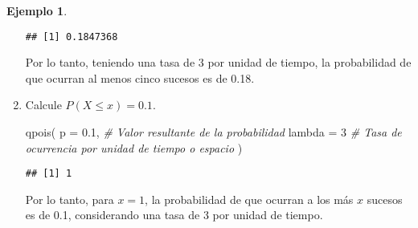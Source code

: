 \documentclass[
]{book}
\newenvironment{Shaded}{\begin{snugshade}}{\end{snugshade}}
\newcommand{\AttributeTok}[1]{\textcolor[rgb]{0.77,0.63,0.00}{#1}}
\newcommand{\CommentTok}[1]{\textcolor[rgb]{0.56,0.35,0.01}{\textit{#1}}}
\newcommand{\DecValTok}[1]{\textcolor[rgb]{0.00,0.00,0.81}{#1}}
\newcommand{\FloatTok}[1]{\textcolor[rgb]{0.00,0.00,0.81}{#1}}
\newcommand{\FunctionTok}[1]{\textcolor[rgb]{0.00,0.00,0.00}{#1}}
\newcommand{\NormalTok}[1]{#1}
\theoremstyle{definition}
\theoremstyle{definition}
\newtheorem{example}{Ejemplo}[chapter]
\theoremstyle{definition}
\theoremstyle{definition}
\theoremstyle{remark}
\begin{document}
\begin{example}
\begin{enumerate}
\begin{verbatim}
## [1] 0.1847368
\end{verbatim}

  Por lo tanto, teniendo una tasa de 3 por unidad de tiempo, la probabilidad de que ocurran al menos cinco sucesos es de 0.18.
\item
  Calcule \(P(X\leq x) = 0.1\).

\begin{Shaded}
\begin{Highlighting}[]
\FunctionTok{qpois}\NormalTok{(}
  \AttributeTok{p =} \FloatTok{0.1}\NormalTok{, }\CommentTok{\# Valor resultante de la probabilidad}
  \AttributeTok{lambda =} \DecValTok{3} \CommentTok{\# Tasa de ocurrencia por unidad de tiempo o espacio}
\NormalTok{  )}
\end{Highlighting}
\end{Shaded}

\begin{verbatim}
## [1] 1
\end{verbatim}

  Por lo tanto, para \(x=1\), la probabilidad de que ocurran a los más \(x\) sucesos es de 0.1, considerando una tasa de 3 por unidad de tiempo.
\end{enumerate}

\end{example}
\end{document}
